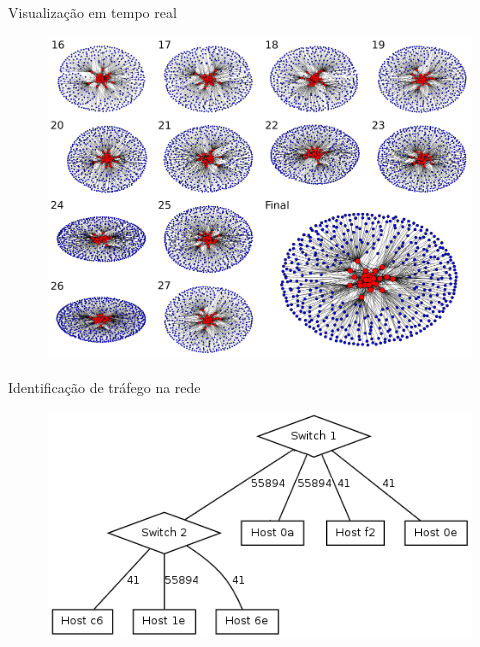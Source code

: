 \begin{frame}{Visualização em tempo real}

    \begin{figure}[!htb]
        \centering
        \includegraphics[scale=.25]{images/full-graph-ipe-1}
    \end{figure}
\end{frame}


\begin{frame}{Identificação de tráfego na rede}

    \begin{figure}[!htb]
        \centering
        \includegraphics[scale=.6]{images/graph-iperf}
    \end{figure}
\end{frame}



